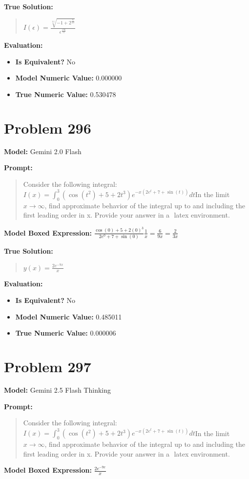 \documentclass{article}
\begin{document}
{\textbf{True Solution:}
\begin{quote}
$I(\epsilon) = \frac{\sqrt[11]{-1 + 2^{\frac{7}{13}}}}{\epsilon^{\frac{136}{77}}}$
\end{quote}

\textbf{Evaluation:}
\begin{itemize}
\item \textbf{Is Equivalent?} No
\item \textbf{Model Numeric Value:} 0.000000
\item \textbf{True Numeric Value:} 0.530478
\end{itemize}
\vspace{1cm}
\section*{Problem 296}
\textbf{Model:} Gemini 2.0 Flash

\textbf{Prompt:}
\begin{quote}
Consider the following integral:$I(x) = \int_0^3 (\cos(t^2) + 5 + 2t^3) e^{-x(2e^t + 7 + \sin(t))} dt$In the limit$x\to\infty$, find approximate behavior of the integral up to and including the first leading order in x. Provide your answer in a $\boxed{}$ latex environment.
\end{quote}
\textbf{Model Boxed Expression:} $\frac{\cos(0) + 5 + 2(0)^3}{2e^0 + 7 + \sin(0)} \frac{1}{x} = \frac{6}{9x} = \frac{2}{3x}$

\textbf{True Solution:}
\begin{quote}
$y(x)= \frac{2e^{-9x}}{x}$
\end{quote}

\textbf{Evaluation:}
\begin{itemize}
\item \textbf{Is Equivalent?} No
\item \textbf{Model Numeric Value:} 0.485011
\item \textbf{True Numeric Value:} 0.000006
\end{itemize}
\vspace{1cm}
\section*{Problem 297}
\textbf{Model:} Gemini 2.5 Flash Thinking

\textbf{Prompt:}
\begin{quote}
Consider the following integral:$I(x) = \int_0^3 (\cos(t^2) + 5 + 2t^3) e^{-x(2e^t + 7 + \sin(t))} dt$In the limit$x\to\infty$, find approximate behavior of the integral up to and including the first leading order in x. Provide your answer in a $\boxed{}$ latex environment.
\end{quote}
\textbf{Model Boxed Expression:} $\frac{2e^{-9x}}{x}$

}
\end{document}

